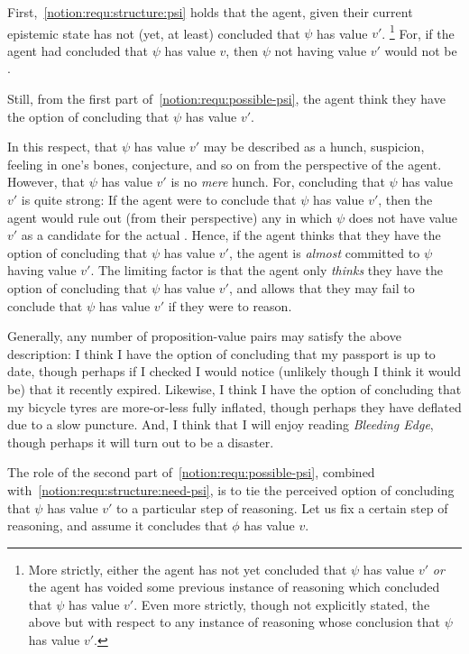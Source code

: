 \begin{note}[\ref{notion:requ:structure:psi}]
  First,~\ref{notion:requ:structure:psi} holds that the agent, given their current epistemic state has not (yet, at least) concluded that \(\psi\) has value \(v'\).\nolinebreak
  \footnote{
    More strictly, either the agent has not yet concluded that \(\psi\) has value \(v'\) \emph{or} the agent has voided some previous instance of reasoning which concluded that \(\psi\) has value \(v'\).
    Even more strictly, though not explicitly stated, the above but with respect to any instance of reasoning whose conclusion \indicateV{} that \(\psi\) has value \(v'\).
  }
  For, if the agent had concluded that \(\psi\) has value \(v\), then \(\psi\) not having value \(v'\) would not be \epVAd{}.

  Still, from the first part of~\ref{notion:requ:possible-psi}, the agent think they have the option of concluding that \(\psi\) has value \(v'\).

  In this respect, that \(\psi\) has value \(v'\) may be described as a hunch, suspicion, feeling in one's bones, conjecture, and so on from the perspective of the agent.
  However, that \(\psi\) has value \(v'\) is no \emph{mere} hunch.
  For, concluding that \(\psi\) has value \(v'\) is quite strong:
  If the agent were to conclude that \(\psi\) has value \(v'\), then the agent would rule out (from their perspective) any \world{} in which \(\psi\) does not have value \(v'\) as a candidate for the actual \world{}.
  Hence, if the agent thinks that they have the option of concluding that \(\psi\) has value \(v'\), the agent is \emph{almost} committed to \(\psi\) having value \(v'\).
  The limiting factor is that the agent only \emph{thinks} they have the option of concluding that \(\psi\) has value \(v'\), and allows that they may fail to conclude that \(\psi\) has value \(v'\) if they were to reason.

  Generally, any number of proposition-value pairs may satisfy the above description:
  I think I have the option of concluding that my passport is up to date, though perhaps if I checked I would notice (unlikely though I think it would be) that it recently expired.
  Likewise, I think I have the option of concluding that my bicycle tyres are more-or-less fully inflated, though perhaps they have deflated due to a slow puncture.
  And, I think that I will enjoy reading \emph{Bleeding Edge}, though perhaps it will turn out to be a disaster.

  The role of the second part of~\ref{notion:requ:possible-psi}, combined with~\ref{notion:requ:structure:need-psi}, is to tie the perceived option of concluding that \(\psi\) has value \(v'\) to a particular step of reasoning.
  Let us fix a certain step of reasoning, and assume it concludes that \(\phi\) has value \(v\).


\end{note}
